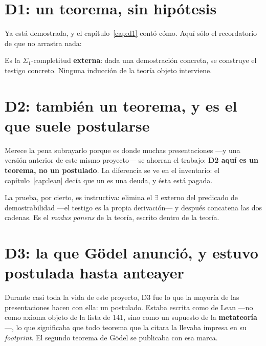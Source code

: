 \section{D1: un teorema, sin hipótesis}

Ya está demostrada, y el capítulo~\ref{cap:d1} contó cómo. Aquí sólo el recordatorio de que no
arrastra nada:


Es la $\Sigma_1$-completitud \textbf{externa}: dada una demostración concreta, se construye el
testigo concreto. Ninguna inducción de la teoría objeto interviene.

\section{D2: también un teorema, y es el que suele postularse}



\begin{observacion}
Merece la pena subrayarlo porque es donde muchas presentaciones —y una versión anterior de este
mismo proyecto— se ahorran el trabajo: \textbf{D2 aquí es un teorema, no un postulado}. La
diferencia se ve en el inventario: el capítulo~\ref{cap:lean} decía que un  es
una deuda, y ésta está pagada.

La prueba, por cierto, es instructiva: elimina el $\exists$ externo del predicado de
demostrabilidad —el testigo es la propia derivación— y después concatena las dos cadenas. Es el
\emph{modus ponens} de la teoría, escrito dentro de la teoría.
\end{observacion}

\section{D3: la que Gödel anunció, y estuvo postulada hasta anteayer}

Durante casi toda la vida de este proyecto, D3 fue lo que la mayoría de las presentaciones hacen
con ella: un postulado. Estaba escrita como  de Lean —no como axioma objeto de la
lista de 141, sino como un supuesto de la \textbf{metateoría}—, lo que significaba que todo
teorema que la citara la llevaba impresa en su \emph{footprint}. El segundo teorema de Gödel se
publicaba con esa marca.

